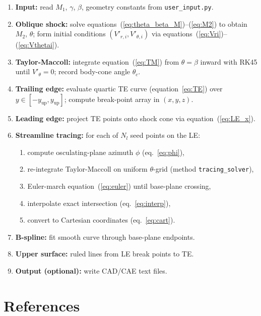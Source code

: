 \documentclass[12pt,a4paper]{article}
\begin{document}
\begin{enumerate}[label=\textbf{Step \arabic*.}, leftmargin=*, itemsep=4pt]
    \item \textbf{Input:} read $M_1$, $\gamma$, $\beta$, geometry constants
          from \texttt{user\_input.py}.
    \item \textbf{Oblique shock:} solve equations~(\ref{eq:theta_beta_M})--(\ref{eq:M2})
          to obtain $M_2$, $\theta$; form initial conditions
          $(V'_{r,i}, V'_{\theta,i})$ via equations~(\ref{eq:Vri})--(\ref{eq:Vthetai}).
    \item \textbf{Taylor-Maccoll:} integrate equation~(\ref{eq:TM}) from
          $\theta = \beta$ inward with RK45 until $V'_\theta = 0$; record
          body-cone angle $\theta_c$.
    \item \textbf{Trailing edge:} evaluate quartic TE curve (equation~\ref{eq:TE})
          over $y \in [-y_{\mathrm{up}}, y_{\mathrm{up}}]$;
          compute break-point array in $(x, y, z)$.
    \item \textbf{Leading edge:} project TE points onto shock cone via
          equation~(\ref{eq:LE_x}).
    \item \textbf{Streamline tracing:} for each of $N_l$ seed points on the LE:
          \begin{enumerate}[label=\alph*.]
              \item compute osculating-plane azimuth $\phi$ (eq.~\ref{eq:phi}),
              \item re-integrate Taylor-Maccoll on uniform $\theta$-grid
                    (method \texttt{tracing\_solver}),
              \item Euler-march equation~(\ref{eq:euler}) until base-plane crossing,
              \item interpolate exact intersection (eq.~\ref{eq:interp}),
              \item convert to Cartesian coordinates (eq.~\ref{eq:cart}).
          \end{enumerate}
    \item \textbf{B-spline:} fit smooth curve through base-plane endpoints.
    \item \textbf{Upper surface:} ruled lines from LE break points to TE.
    \item \textbf{Output (optional):} write CAD/CAE text files.
\end{enumerate}

\section{References}
\label{sec:refs}
\end{document}
